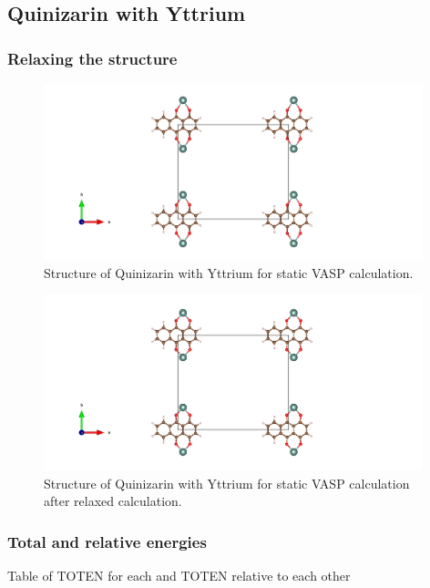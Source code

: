 \documentclass{article}
\begin{document}
  \subsection{Quinizarin with Yttrium}

    \subsubsection{Relaxing the structure}


      \begin{figure}[H]
        \centering
        \includegraphics[width = 11cm]{../fig/Y_staticbefore_CONTCAR.png}
        \caption{Structure of Quinizarin with Yttrium for static VASP calculation. }
        \label{fig:Y_staticbefore_CONTCAR}
      \end{figure}

      \begin{figure}[H]
        \centering
        \includegraphics[width = 11cm]{../fig/Y_staticafter_CONTCAR.png}
        \caption{Structure of Quinizarin with Yttrium for static VASP   calculation after relaxed calculation. }
        \label{fig:Y_staticafter_CONTCAR}
      \end{figure}


    \subsubsection{Total and relative energies}

      Table of TOTEN for each and TOTEN relative to each other
\end{document}
